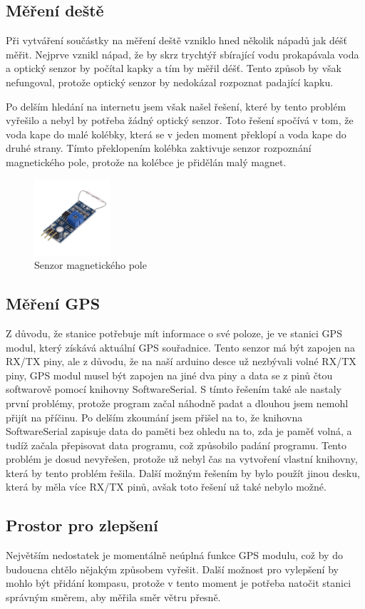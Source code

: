 \subsection{Měření deště}
Při vytváření součástky na měření deště vzniklo hned několik nápadů jak déšť měřit. Nejprve vznikl nápad, že by skrz trychtýř sbírající vodu prokapávala voda a optický senzor by počítal kapky a tím by měřil déšť.
Tento způsob by však nefungoval, protože optický senzor by nedokázal rozpoznat padající kapku.

Po delším hledání na internetu jsem však našel řešení\cite{mereni_deste}, které by tento problém vyřešilo a nebyl by potřeba žádný optický senzor. Toto řešení spočívá v tom, že voda kape do malé kolébky, která se v jeden moment překlopí a voda kape do druhé strany.
Tímto překlopením kolébka zaktivuje senzor rozpoznání magnetického pole, protože na kolébce je přidělán malý magnet.

\begin{figure}[h] 
    \centering
    \includegraphics[width=0.25\textwidth]{images/magnet_sensor.jpg}
    \caption{Senzor magnetického pole}
\end{figure}

\subsection{Měření GPS}
Z důvodu, že stanice potřebuje mít informace o své poloze, je ve stanici GPS modul, který získává aktuální GPS souřadnice. Tento senzor má být zapojen na RX/TX piny, ale z důvodu, že na naší arduino desce už
nezbývali volné RX/TX piny, GPS modul musel být zapojen na jiné dva piny a data se z pinů čtou softwarově pomocí knihovny SoftwareSerial. S tímto řešením také ale nastaly první problémy, protože program začal náhodně padat a dlouhou jsem nemohl přijít na příčinu.
Po delším zkoumání jsem přišel na to, že knihovna SoftwareSerial zapisuje data do paměti bez ohledu na to, zda je paměť volná, a tudíž začala přepisovat data programu, což způsobilo padání programu.
Tento problém je dosud nevyřešen, protože už nebyl čas na vytvoření vlastní knihovny, která by tento problém řešila. Další možným řešením by bylo použít jinou desku, která by měla více RX/TX pinů, avšak toto řešení už také nebylo možné.

\subsection{Prostor pro zlepšení}
Největším nedostatek je momentálně neúplná funkce GPS modulu, což by do budoucna chtělo nějakým způsobem vyřešit.
Další možnost pro vylepšení by mohlo být přidání kompasu, protože v tento moment je potřeba natočit stanici správným směrem, aby měřila směr větru přesně. 


